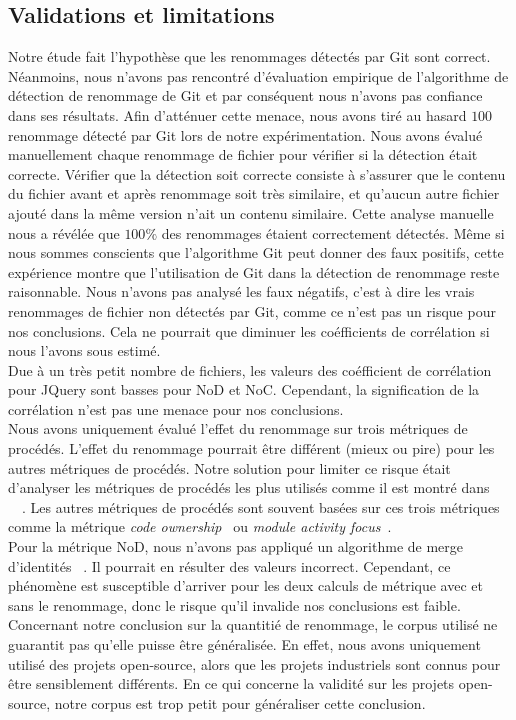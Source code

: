 \subsection{Validations et limitations}

Notre étude fait l'hypothèse que les renommages détectés par Git sont correct. Néanmoins, nous n'avons pas rencontré d'évaluation empirique de l'algorithme de détection de renommage de Git et par conséquent nous n'avons pas confiance dans ses résultats. Afin d'atténuer cette menace, nous avons tiré au hasard $100$ renommage détecté par Git lors de notre expérimentation. Nous avons évalué manuellement chaque renommage de fichier pour vérifier si la détection était correcte. Vérifier que la détection soit correcte consiste à s'assurer que le contenu du fichier avant et après renommage soit très similaire, et qu'aucun autre fichier ajouté dans la même version n'ait un contenu similaire. Cette analyse manuelle nous a révélée que  $100\%$ des renommages étaient correctement détectés. Même si nous sommes conscients que l'algorithme Git peut donner des faux positifs, cette expérience montre que l'utilisation de Git dans la détection de renommage reste raisonnable. Nous n'avons pas analysé les faux négatifs, c'est à dire les vrais renommages de fichier non détectés par Git, comme ce n'est pas un risque pour nos conclusions. Cela ne pourrait que diminuer les coéfficients de corrélation si nous l'avons sous estimé.\\  

 Due à un très petit nombre de fichiers, les valeurs des coéfficient de corrélation pour JQuery sont basses pour NoD et NoC. Cependant, la signification de la corrélation n'est pas une menace pour nos conclusions.\\

Nous avons uniquement évalué l'effet du renommage sur trois métriques de procédés. L'effet du renommage pourrait être différent (mieux ou pire) pour les autres métriques de procédés. Notre solution pour limiter ce risque était d'analyser les métriques de procédés les plus utilisés comme il est montré dans ~~\cite{radjenovic_software_2013}. Les autres métriques de procédés sont souvent basées sur ces trois métriques comme la métrique \emph{code ownership}~\cite{bird_dont_2011} ou \emph{module activity focus}~\cite{posnett_dual_2013}.\\

Pour la métrique NoD, nous n'avons pas appliqué un algorithme de merge d'identités ~\cite{goeminne_comparison_2013}. Il pourrait en résulter des valeurs incorrect. Cependant, ce phénomène est susceptible d'arriver pour les deux calculs de métrique avec et sans le renommage, donc le risque qu'il invalide nos conclusions est faible.\\

Concernant notre conclusion sur la quantitié de renommage, le corpus utilisé ne guarantit pas qu'elle puisse être généralisée. En effet, nous avons uniquement utilisé des projets open-source, alors que les projets industriels sont connus pour être sensiblement différents. En ce qui concerne la validité sur les projets open-source, notre corpus est trop petit pour généraliser cette conclusion.\\
